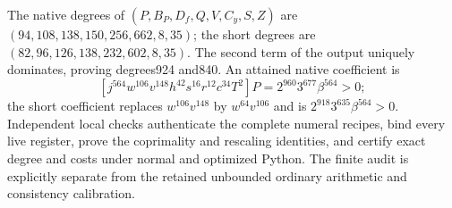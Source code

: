 The native degrees of $(P,B_P,D_f,Q,V,C_y,S,Z)$ are
$(94,108,138,150,256,662,8,35)$; the short degrees are
$(82,96,126,138,232,602,8,35)$. The second term of the output uniquely
dominates, proving degrees924 and840.
An attained native coefficient is
\[
 [j^{564}w^{106}v^{148}h^{42}s^{16}r^{12}c^{34}T^2]P
       =2^{960}3^{677}\beta^{564}>0;
\]
the short coefficient replaces $w^{106}v^{148}$ by $w^{64}v^{106}$
and is $2^{918}3^{635}\beta^{564}>0$.
Independent local checks authenticate the complete numeral recipes,
bind every live register, prove the coprimality and rescaling identities,
and certify exact degree and costs under normal and optimized Python.
The finite audit is explicitly separate from the retained unbounded
ordinary arithmetic and consistency calibration.
